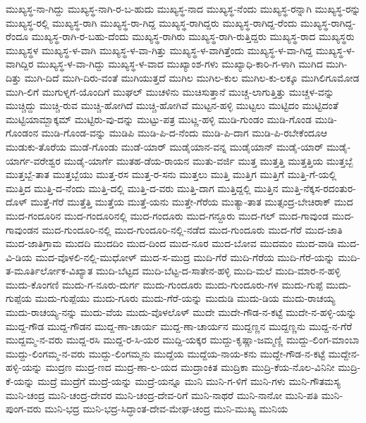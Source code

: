 ಮುಖ್ಯಸ್ಥ-ನಾ-ಗಿದ್ದು
ಮುಖ್ಯಸ್ಥ-ನಾಗಿ-ರ-ಬ-ಹುದು
ಮುಖ್ಯಸ್ಥ-ನಾದ
ಮುಖ್ಯಸ್ಥ-ನೆಂದು
ಮುಖ್ಯಸ್ಥ-ರನ್ನಾಗಿ
ಮುಖ್ಯಸ್ಥ-ರನ್ನು
ಮುಖ್ಯಸ್ಥ-ರಲ್ಲಿ
ಮುಖ್ಯಸ್ಥ-ರಾಗಿ
ಮುಖ್ಯಸ್ಥ-ರಾ-ಗಿದ್ದ
ಮುಖ್ಯಸ್ಥ-ರಾಗಿದ್ದರು
ಮುಖ್ಯಸ್ಥ-ರಾಗಿದ್ದ-ರೆಂದು
ಮುಖ್ಯಸ್ಥ-ರಾಗಿದ್ದ-ರೆಂದೂ
ಮುಖ್ಯಸ್ಥ-ರಾಗಿ-ರ-ಬಹು-ದೆಂದು
ಮುಖ್ಯಸ್ಥ-ರಾಗಿರು
ಮುಖ್ಯಸ್ಥ-ರಾಗಿ-ರುತ್ತಿದ್ದರು
ಮುಖ್ಯಸ್ಥ-ರಾದ
ಮುಖ್ಯಸ್ಥರು
ಮುಖ್ಯಸ್ಥಳ
ಮುಖ್ಯಸ್ಥ-ಳ-ವಾಗಿ
ಮುಖ್ಯಸ್ಥ-ಳ-ವಾ-ಗಿತ್ತು
ಮುಖ್ಯಸ್ಥ-ಳ-ವಾಗಿತ್ತೆಂದು
ಮುಖ್ಯಸ್ಥ-ಳ-ವಾ-ಗಿದ್ದ
ಮುಖ್ಯಸ್ಥ-ಳ-ವಾಗಿದ್ದಿರ
ಮುಖ್ಯಸ್ಥ-ಳ-ವಾ-ಗಿದ್ದು
ಮುಖ್ಯಸ್ಥ-ಳ-ವಾದ
ಮುಖ್ಯಾಂಶ-ಗಳು
ಮುಖ್ಯಾಧಿ-ಕಾರಿ-ಗ-ಳಾಗಿ
ಮುಗಿದ
ಮುಗಿ-ದಿತ್ತು
ಮುಗಿ-ದಿದೆ
ಮುಗಿ-ದಿರು-ವಂತೆ
ಮುಗಿಯುತ್ತದೆ
ಮುಗಿಲ
ಮುಗಿಲ-ಕುಲ
ಮುಗಿಲ-ಕು-ಲಕ್ಕೂ
ಮುಗಿಲಿಗೂಮೋಡ
ಮುಗಿ-ಲಿಗೆ
ಮುಗುಳ್ನಗೆ-ಯೊಂದಿಗೆ
ಮುಘಲ್
ಮುಚಳಿನು
ಮುಚಿಸುತ್ತಾನೆ
ಮುಚ್ಚ-ಲಾಗುತ್ತಿತ್ತು
ಮುಚ್ಚಳ-ವನ್ನು
ಮುಚ್ಚಿದ್ದು
ಮುಚ್ಚಿ-ರುವ
ಮುಚ್ಚಿ-ಹೋಗಿದೆ
ಮುಚ್ಚಿ-ಹೋಗಿವೆ
ಮುಟ್ಟನ-ಹಳ್ಳಿ
ಮುಟ್ಟಲು
ಮುಟ್ಟಿದಂ
ಮುಟ್ಟಿದಂತೆ
ಮುಟ್ಟಿಯಾಮ್ಬಾಕ್ಕಮ್
ಮುಟ್ಟಿರು-ವು-ದನ್ನು
ಮುಟ್ಟು-ಪತ್ರ
ಮುಟ್ಣ-ಹಳ್ಳಿ
ಮುಡಿ-ಗುಂಡಂ
ಮುಡಿ-ಗೊಂಡ
ಮುಡಿ-ಗೊಂಡಂನ
ಮುಡಿ-ಗೊಂಡ-ವನ್ನು
ಮುಡಿಪಿ
ಮುಡಿ-ಪಿ-ದ-ನೆಂದು
ಮುಡಿ-ಪಿ-ದಾಗ
ಮುಡಿ-ಪಿ-ರಬೇಕೆಂದೂಆ
ಮುಡುಕು-ತೊರೆಯ
ಮುಡೆ-ಗೊಂಡು
ಮುಡೆ-ಯಾರ್
ಮುಡೈಯಾನ-ವನ್ನ
ಮುಡೈಯಾನ್
ಮುಡೈ-ಯಾರ್
ಮುಡೈ-ಯಾರ್ಗ-ವರೇಶ್ವರ
ಮುಡೈ-ಯಾರ್ಗೆ
ಮುತಹ-ಡೆಯ-ರಾಯನ
ಮುತು-ವರ್ಜಿ
ಮುತ್ತ
ಮುತ್ತತ್ತಿ
ಮುತ್ತತ್ತಿಯ
ಮುತ್ತಬ್ಬೆ
ಮುತ್ತಬ್ಬೆ-ತಾತ
ಮುತ್ತಬ್ಬೆಯು
ಮುತ್ತ-ರಸ
ಮುತ್ತ-ರ-ಸನು
ಮುತ್ತಲು
ಮುತ್ತಿ
ಮುತ್ತಿಗ
ಮುತ್ತಿಗೆ
ಮುತ್ತಿ-ಗೆ-ಯಲ್ಲಿ
ಮುತ್ತಿದ
ಮುತ್ತಿ-ದ-ನೆಂದು
ಮುತ್ತಿ-ದಲ್ಲಿ
ಮುತ್ತಿ-ದ-ವರು
ಮುತ್ತಿ-ದಾಗ
ಮುತ್ತಿದ್ದಲ್ಲಿ
ಮುತ್ತಿನ
ಮುತ್ತಿ-ನೆಕ್ಕಸ-ರದಂತುರ-ದೊಳ್
ಮುತ್ತೆ-ಗೆರೆ
ಮುತ್ತೆತ್ತಿ
ಮುತ್ತೆಯ
ಮುತ್ತೆ-ಯನು
ಮುತ್ತೇ-ಗೆರೆಯ
ಮುತ್ಯಾ-ತಾತ
ಮುತ್ಸಂದ್ರ-ಬೇಚಿರಾಕ್
ಮುದ
ಮುದ-ಗಂದೂರಿನ
ಮುದ-ಗಂದೂರಿನಲ್ಲಿ
ಮುದ-ಗಂದೂರು
ಮುದ-ಗನ್ದೂರು
ಮುದ-ಗಲ್
ಮುದ-ಗಾವುಂಡ
ಮುದ-ಗಾವುಂಡನ
ಮುದ-ಗುಂದೂರಿ-ನಲ್ಲಿ
ಮುದ-ಗುಂದೂರಿ-ನಲ್ಲಿ-ನಡೆದ
ಮುದ-ಗುಂದೂರು
ಮುದ-ಗೆರೆ
ಮುದ-ಜಾತಿ
ಮುದ-ಜಾತಿಗ್ರಾಮ
ಮುದದಿ
ಮುದದಿಂ
ಮುದ-ದಿಂದ
ಮುದ-ನೂರ
ಮುದ-ಬೋವ
ಮುದಮಂ
ಮುದ-ವಾಡಿ
ಮುದ-ವಿ-ಡಿಯ
ಮುದ-ವೊಳಲಿ-ನಲ್ಲಿ-ಮುಧೋಳ್
ಮುದ-ಸ-ಮುದ್ರ
ಮುದಿ-ಗೆರೆ
ಮುದಿ-ಗೆರೆಯ
ಮುದಿ-ಗೆರೆ-ಯನ್ನು
ಮುದಿ-ತ-ಮೂರ್ತಿರ್ಲೋಕ-ವಿಖ್ಯಾತ
ಮುದಿ-ಬೆಟ್ಟದ
ಮುದಿ-ಬೆಟ್ಟ-ದ-ಸಾತೇನ-ಹಳ್ಳಿ
ಮುದಿ-ಮಲೆ
ಮುದಿ-ಮಾರ-ನ-ಹಳ್ಳಿ
ಮುದು-ಕೊಂಗಣಿ
ಮುದು-ಗ-ನೂರು-ದುರ್ಗ
ಮುದು-ಗುಂದೂರು
ಮುದು-ಗುಂದೂರು-ಗಳ
ಮುದು-ಗುಪ್ಪೆ
ಮುದು-ಗುಪ್ಪೆಯ
ಮುದು-ಗುಪ್ಪೆಯು
ಮುದು-ಗೂರು
ಮುದು-ಗೆರೆ-ಯನ್ನು
ಮುದುಡಿ
ಮುದು-ಡಿಯ
ಮುದು-ರಾಚಯ್ಯ
ಮುದು-ರಾಚಯ್ಯ-ನನ್ನು
ಮುದು-ವೆಯ
ಮುದು-ವೊಳಲೊಳ್
ಮುದೇ
ಮುದೇ-ಗೌಡ-ನ-ಕಟ್ಟೆ
ಮುದೇ-ನ-ಹಳ್ಳಿ-ಯನ್ನು
ಮುದ್ದ-ಗೌಡ
ಮುದ್ದ-ಗೌಡನ
ಮುದ್ದ-ಣಾ-ಚಾರ್ಯ
ಮುದ್ದ-ಣಾ-ಚಾರ್ಯನ
ಮುದ್ದಣ್ಣನ
ಮುದ್ದಣ್ಣನು
ಮುದ್ದ-ನ-ಗೆರೆ
ಮುದ್ದಮ್ಮ-ನ-ವರು
ಮುದ್ದ-ರಸಿ
ಮುದ್ದ-ರ-ಸಿ-ಯರ
ಮುದ್ದಿ-ಯಕ್ಕರ
ಮುದ್ದು-ಕೃಷ್ಣಾ-ಜಮ್ಮಣ್ಣಿ
ಮುದ್ದು-ಲಿಂಗ-ಮಾಂಬಾ
ಮುದ್ದು-ಲಿಂಗಮ್ಮ-ನ-ವರು
ಮುದ್ದು-ಲಿಂಗಮ್ಮನು
ಮುದ್ದೆಯ
ಮುದ್ದೆಯ-ನಾಯ-ಕನು
ಮುದ್ದೇ-ಗೌಡ-ನ-ಕಟ್ಟೆ
ಮುದ್ದೇನ-ಹಳ್ಳಿ-ಯನ್ನು
ಮುದ್ರಣ
ಮುದ್ರ-ಣದ
ಮುದ್ರ-ಣಾ-ಲ-ಯದ
ಮುದ್ರಾಂಕಿತ
ಮುದ್ರಿಕಾ
ಮುದ್ರಿ-ಕೆಯ-ನೊಲ-ವಿನಿನೀ
ಮುದ್ರಿ-ಕೆ-ಯನ್ನು
ಮುದ್ರೆ
ಮುದ್ರೆಗೆ
ಮುದ್ರೆ-ಯನ್ನು
ಮುದ್ರೆ-ಯನ್ನೂ
ಮುನಿ
ಮುನಿ-ಗ-ಳಿಗೆ
ಮುನಿ-ಗಳು
ಮುನಿ-ಗೌತಮಸ್ಯ
ಮುನಿ-ಚಂದ್ರ
ಮುನಿ-ಚಂದ್ರ-ದೇವರ
ಮುನಿ-ಚಂದ್ರ-ದೇವ-ರಿಗೆ
ಮುನಿ-ನಾಥರೆ
ಮುನಿ-ನಾನೋ
ಮುನಿ-ಪತಿ
ಮುನಿ-ಪುಂಗ-ವರು
ಮುನಿ-ಭದ್ರ
ಮುನಿ-ಭದ್ರ-ಸಿದ್ಧಾಂತ-ದೇವ-ಮೇಘ-ಚಂದ್ರ
ಮುನಿ-ಮುಖ್ಯ
ಮುನಿಯ
